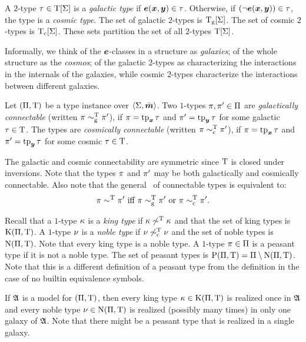 \begin{definition}
A $2$-type $\tau \in \mathrm{T}[\mathrm{\Sigma}]$ is a \emph{galactic type} if $\bm{e}(\bm{x},\bm{y}) \in
\tau$.
Otherwise, if $(\lnot\bm{e}(\bm{x},\bm{y})) \in \tau$, the type is a \emph{cosmic type}.
The set of galactic $2$-types is $\mathrm{T}_{\mathrm{g}}[\mathrm{\Sigma}]$.
The set of cosmic $2$-types is $\mathrm{T}_{\mathrm{c}}[\mathrm{\Sigma}]$. These sets partition the set of all
$2$-types $\mathrm{T}[\mathrm{\Sigma}]$.
\end{definition}
Informally, we think of the $\bm{e}$-classes in a structure as \emph{galaxies}; of
the whole structure as the \emph{cosmos}; of the galactic $2$-types as
characterizing the interactions in the internals of the galaxies, while cosmic $2$-types
characterize the interactions between different galaxies.

\begin{definition}
Let $(\Pi,\mathrm{T})$ be a type instance over $\left\langle \mathrm{\Sigma},\bar{\bm{m}} \right\rangle$.
Two $1$-types $\pi, {\pi'} \in \Pi$ are \emph{galactically connectable}
(written $\pi \sim_{\mathrm{g}}^{\mathrm{T}} {\pi'}$), if $\pi = \operatorname{tp}_{\bm{x}}\tau$ and ${\pi'} =
\operatorname{tp}_{\bm{y}}\tau$ for some galactic $\tau \in \mathrm{T}$.
The types are \emph{cosmically connectable} (written $\pi \sim_{\mathrm{c}}^{\mathrm{T}}
{\pi'}$), if $\pi = \operatorname{tp}_{\bm{x}}\tau$ and ${\pi'} = \operatorname{tp}_{\bm{y}}\tau$ for some cosmic $\tau \in \mathrm{T}$.

The galactic and cosmic connectability are symmetric since $\mathrm{T}$ is closed
under inversions.
Note that the types $\pi$ and ${\pi'}$ may be both galactically and cosmically
connectable. Also note that the general~ of connectable
types is equivalent to:
\[
  \pi \sim^{\mathrm{T}} {\pi'} \text{ iff } 
  \pi \sim_{\mathrm{g}}^{\mathrm{T}} {\pi'} \text{ or } \pi \sim_{\mathrm{c}}^{\mathrm{T}} {\pi'}.
\]

Recall that a $1$-type $\kappa$ is a \emph{king type} if $\kappa \not\sim^{\mathrm{T}}
\kappa$ and that the set of king types is $\mathrm{K}(\Pi,\mathrm{T})$.
A $1$-type $\nu$ is a \emph{noble type} if $\nu \not\sim_{\mathrm{c}}^{\mathrm{T}} \nu$ and
the set of noble types is $\mathrm{\mathrm{N}}(\Pi,\mathrm{T})$.
Note that every king type is a noble type. A $1$-type $\pi \in \Pi$ is a
peasant type if it is not a noble type. The set of peasant types is
$\mathrm{P}(\Pi,\mathrm{T}) = \Pi \setminus \mathrm{\mathrm{N}}(\Pi,\mathrm{T})$.
Note that this is a different definition of a peasant type from the definition
in the case of no builtin equivalence symbols.
\end{definition}

\begin{remark}\label{rem:twovar-noble-once}
If $\mathfrak{A}$ is a model for $(\Pi,\mathrm{T})$, then every king type
$\kappa \in \mathrm{K}(\Pi,\mathrm{T})$ is realized once in $\mathfrak{A}$ and every noble type
$\nu \in \mathrm{\mathrm{N}}(\Pi,\mathrm{T})$ is realized (possibly many times) in only one galaxy
of $\mathfrak{A}$. Note that there might be a peasant type that is realized in a single
galaxy.
\end{remark}

